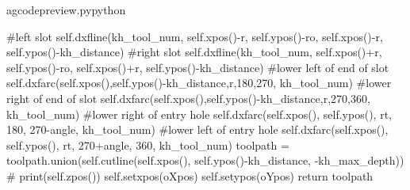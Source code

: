 \documentclass{ltxdoc}
\begin{document}
\begin{writecode}{a}{gcodepreview.py}{python}
{#left slot
            self.dxfline(kh_tool_num, self.xpos()-r, self.ypos()-ro, self.xpos()-r, self.ypos()-kh_distance)
#right slot
            self.dxfline(kh_tool_num, self.xpos()+r, self.ypos()-ro, self.xpos()+r, self.ypos()-kh_distance)
#lower left of end of slot
            self.dxfarc(self.xpos(),self.ypos()-kh_distance,r,180,270, kh_tool_num)
#lower right of end of slot
            self.dxfarc(self.xpos(),self.ypos()-kh_distance,r,270,360, kh_tool_num)
#lower right of entry hole
            self.dxfarc(self.xpos(), self.ypos(), rt, 180, 270-angle, kh_tool_num)
#lower left of entry hole
            self.dxfarc(self.xpos(), self.ypos(), rt, 270+angle, 360, kh_tool_num)
            toolpath = toolpath.union(self.cutline(self.xpos(), self.ypos()-kh_distance, -kh_max_depth))
#        print(self.zpos())
        self.setxpos(oXpos)
        self.setypos(oYpos)
        return toolpath
            
}
\end{writecode}
\end{document}
